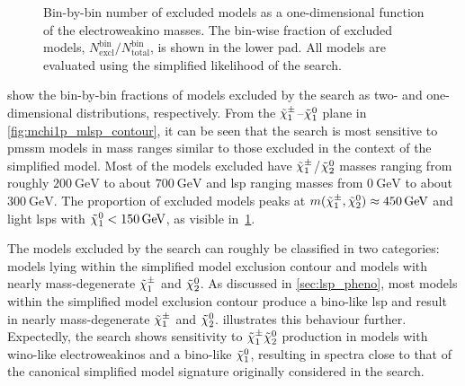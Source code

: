 \begin{figure}
\begin{subfigure}[b]{0.5\linewidth}
	\end{subfigure}\hfill
	\caption{Bin-by-bin number of excluded models as a one-dimensional function of the electroweakino masses. The bin-wise fraction of excluded models, $N^\mathrm{bin}_\mathrm{excl} / N^\mathrm{bin}_\mathrm{total}$, is shown in the lower pad. All models are evaluated using the simplified likelihood of the \onelepton search.}
	\label{fig:impact_electroweakinos_1D}
\end{figure}


 show the bin-by-bin fractions of models excluded by the \onelepton search as two- and one-dimensional distributions, respectively. From the $\tilde{\chi}_1^\pm$--$\tilde{\chi}_1^0$ plane in \cref{fig:mchi1p_mlsp_contour}, it can be seen that the \onelepton search is most sensitive to \gls{pmssm} models in mass ranges similar to those excluded in the context of the simplified model. Most of the models excluded have $\tilde{\chi}_1^\pm$/$\tilde{\chi}_2^0$ masses ranging from roughly $\SI{200}{\GeV}$ to about $\SI{700}{\GeV}$ and \gls{lsp} ranging masses from $\SI{0}{\GeV}$ to about $\SI{300}{\GeV}$. The proportion of excluded models peaks at $m(\charg,\neutr) \approx \SI{450}{\GeV}$ and light \glspl{lsp} with $\lsp < \SI{150}{\GeV}$, as visible in~\cref{fig:impact_electroweakinos_1D}. 

The models excluded by the \onelepton search can roughly be classified in two categories: models lying within the simplified model exclusion contour and models with nearly mass-degenerate $\tilde{\chi}_1^\pm$ and $\tilde{\chi}_2^0$. As discussed in \cref{sec:lsp_pheno}, most models within the simplified model exclusion contour produce a bino-like \gls{lsp} and result in nearly mass-degenerate $\tilde{\chi}_1^\pm$ and $\tilde{\chi}_2^0$.  illustrates this behaviour further. Expectedly, the \onelepton search shows sensitivity to $\tilde{\chi}_1^\pm\tilde{\chi}_2^0$ production in models with wino-like electroweakinos and a bino-like $\tilde{\chi}_1^0$, resulting in spectra close to that of the canonical simplified model signature originally considered in the search. 

